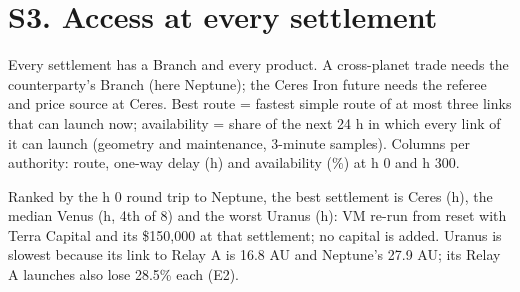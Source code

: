 \section*{S3. Access at every settlement}

Every settlement has a Branch and every product. A cross-planet trade needs the counterparty's Branch (here Neptune);
the Ceres Iron future needs the referee and price source at Ceres. Best route = fastest simple route of at most three
links that can launch now; availability = share of the next 24 h in which every link of it can launch (geometry and
maintenance, 3-minute samples). Columns per authority: route, one-way delay (h) and availability (\%) at h 0 and h 300.
{\setlength{\tabcolsep}{4pt}}

Ranked by the h 0 round trip to Neptune, the best settlement is Ceres (\SimCeresComplete h), the median Venus (\SimVenusComplete h, 4th of 8) and the worst Uranus (\SimUranusComplete h): VM re-run from reset with Terra Capital and its \$150{,}000 at that settlement; no capital is added. Uranus is slowest because its link to Relay A is 16.8 AU and Neptune's 27.9 AU; its Relay A launches also lose 28.5\% each (E2).
